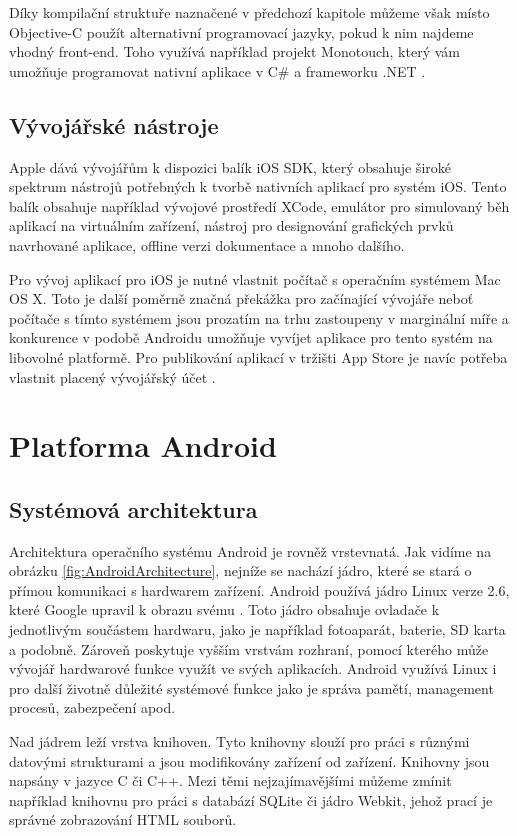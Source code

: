 Díky kompilační struktuře naznačené v předchozí kapitole můžeme však místo Objective-C použít alternativní programovací jazyky, pokud k nim najdeme vhodný front-end. Toho využívá například projekt Monotouch, který vám umožňuje programovat nativní aplikace v C\# a frameworku .NET \cite{xamarin_monotouch}.

\subsection{Vývojářské nástroje}
Apple dává vývojářům k dispozici balík iOS SDK, který obsahuje široké spektrum nástrojů potřebných k tvorbě nativních aplikací pro systém iOS. Tento balík obsahuje například vývojové prostředí XCode, emulátor pro simulovaný běh aplikací na virtuálním zařízení, nástroj pro designování grafických prvků navrhované aplikace, offline verzi dokumentace a mnoho dalšího.

Pro vývoj aplikací pro iOS je nutné vlastnit počítač s operačním systémem Mac OS X. Toto je další poměrně značná překážka pro začínající vývojáře neboť počítače s tímto systémem jsou prozatím na trhu zastoupeny v marginální míře a konkurence v podobě Androidu umožňuje vyvíjet aplikace pro tento systém na libovolné platformě.  Pro publikování aplikací v tržišti App Store je navíc potřeba vlastnit placený vývojářský účet \cite{distribute_ios_app}.

\section{Platforma Android}
\subsection{Systémová architektura}
Architektura operačního systému Android je rovněž vrstevnatá. Jak vidíme na obrázku \ref{fig:AndroidArchitecture}, nejníže se nachází jádro, které se stará o přímou komunikaci s hardwarem zařízení. Android používá jádro Linux verze 2.6, které Google upravil k obrazu svému \cite{android_architecture}. Toto jádro obsahuje ovladače k jednotlivým součástem hardwaru, jako je například fotoaparát, baterie, SD karta a podobně. Zároveň poskytuje vyšším vrstvám rozhraní, pomocí kterého může vývojář hardwarové funkce využít ve svých aplikacích. Android využívá Linux i pro další životně důležité systémové funkce jako je správa pamětí, management procesů, zabezpečení apod.

Nad jádrem leží vrstva knihoven. Tyto knihovny slouží pro práci s různými datovými strukturami a jsou modifikovány zařízení od zařízení. Knihovny jsou napsány v jazyce C či C++. Mezi těmi nejzajímavějšími můžeme zmínit například knihovnu pro práci s databází SQLite či jádro Webkit, jehož prací je správné zobrazování HTML souborů.

